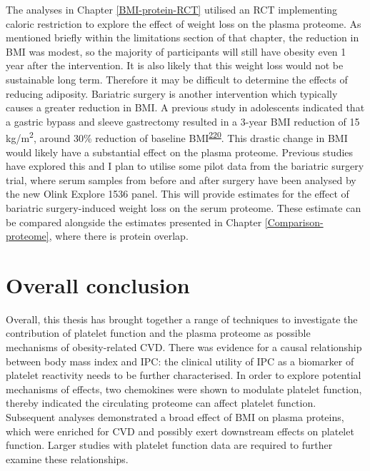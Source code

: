 \documentclass[11pt,twoside]{bristolthesis}
\begin{document}
The analyses in Chapter \ref{BMI-protein-RCT} utilised an RCT implementing caloric restriction to explore the effect of weight loss on the plasma proteome. As mentioned briefly within the limitations section of that chapter, the reduction in BMI was modest, so the majority of participants will still have obesity even 1 year after the intervention. It is also likely that this weight loss would not be sustainable long term. Therefore it may be difficult to determine the effects of reducing adiposity. Bariatric surgery is another intervention which typically causes a greater reduction in BMI. A previous study in adolescents indicated that a gastric bypass and sleeve gastrectomy resulted in a 3-year BMI reduction of 15 kg/m\textsuperscript{2}, around 30\% reduction of baseline BMI\textsuperscript{\protect\hyperlink{ref-Inge2016}{220}}. This drastic change in BMI would likely have a substantial effect on the plasma proteome. Previous studies have explored this and I plan to utilise some pilot data from the bariatric surgery trial, where serum samples from before and after surgery have been analysed by the new Olink Explore 1536 panel. This will provide estimates for the effect of bariatric surgery-induced weight loss on the serum proteome. These estimate can be compared alongside the estimates presented in Chapter \ref{Comparison-proteome}, where there is protein overlap.

\hypertarget{overall-conclusion}{%
\section{Overall conclusion}\label{overall-conclusion}}

Overall, this thesis has brought together a range of techniques to investigate the contribution of platelet function and the plasma proteome as possible mechanisms of obesity-related CVD. There was evidence for a causal relationship between body mass index and IPC: the clinical utility of IPC as a biomarker of platelet reactivity needs to be further characterised. In order to explore potential mechanisms of effects, two chemokines were shown to modulate platelet function, thereby indicated the circulating proteome can affect platelet function. Subsequent analyses demonstrated a broad effect of BMI on plasma proteins, which were enriched for CVD and possibly exert downstream effects on platelet function. Larger studies with platelet function data are required to further examine these relationships.

\appendix
\end{document}
